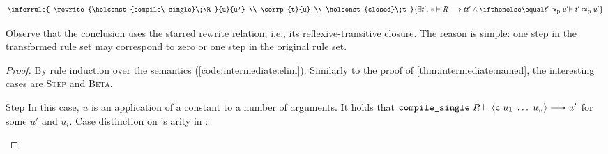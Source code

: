 \begin{theorem}\label{thm:intermediate:elim:correctness}
  \[
    \inferrule{
      \rewrite{\holconst{compile\_single}\;\R}{u}{u'} \\
      \corrp{t}{u} \\
      \holconst{closed}\;t
    }{
      \exists t'.\;\rewrite*\R t t' \wedge \corrp{t'}{u'}
    }
  \]
\end{theorem}

\noindent
Observe that the conclusion uses the starred rewrite relation, i.e., its reflexive-transitive closure.
The reason is simple:
one step in the transformed rule set may correspond to zero or one step in the original rule set.

\begin{proof}
  By rule induction over the semantics (\cref{code:intermediate:elim}).
  Similarly to the proof of \cref{thm:intermediate:named}, the interesting cases are \textsc{Step} and \textsc{Beta}.

  \begin{induction}
    \item[Step]
      In this case, $u$ is an application of a constant to a number of arguments.
      It holds that $\texttt{\textup{compile\_single}}\;R \vdash \left\langle\texttt{\textup{c}}\;u_1\;\ldots\;u_n\right\rangle \longrightarrow u'$ for some $u'$ and $u_i$.
      Case distinction on 's arity in \R:


\end{induction}
\end{proof}

